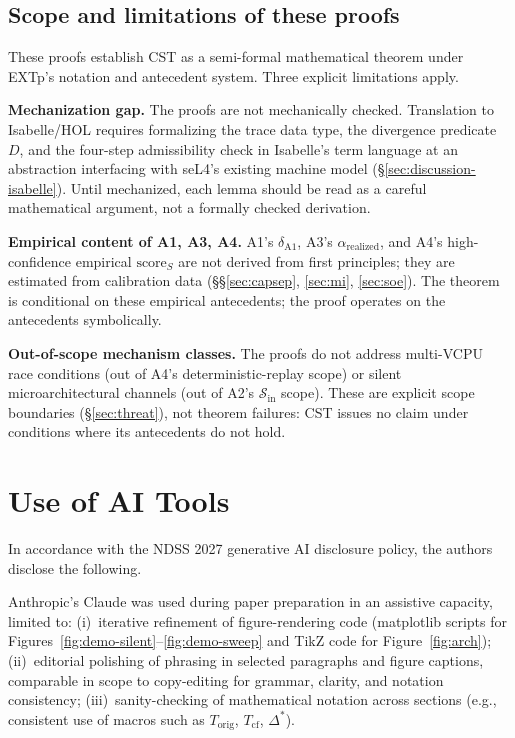 \documentclass[conference]{IEEEtran}
\newcommand{\Korig}{T_\text{orig}}
\newcommand{\Tcf}{T_\text{cf}}
\newcommand{\Dstar}{\Delta^{*}}
\newcommand{\arealized}{\alpha_\text{realized}}
\newcommand{\scoreS}{\text{score}_S}
\begin{document}
\subsection{Scope and limitations of these proofs}

These proofs establish CST as a semi-formal mathematical
theorem under EXTp's notation and antecedent system. Three
explicit limitations apply.

\textbf{Mechanization gap.} The proofs are not mechanically
checked. Translation to Isabelle/HOL requires formalizing the
trace data type, the divergence predicate $D$, and the
four-step admissibility check in Isabelle's term language at
an abstraction interfacing with seL4's existing machine model
(\S\ref{sec:discussion-isabelle}). Until mechanized, each lemma
should be read as a careful mathematical argument, not a
formally checked derivation.

\textbf{Empirical content of A1, A3, A4.} A1's
$\delta_{\text{A1}}$, A3's $\arealized$, and A4's
high-confidence empirical $\scoreS$ are not derived from first
principles; they are estimated from calibration data
(\S\S\ref{sec:capsep}, \ref{sec:mi}, \ref{sec:soe}). The theorem
is conditional on these empirical antecedents; the proof
operates on the antecedents symbolically.

\textbf{Out-of-scope mechanism classes.} The proofs do not address
multi-VCPU race conditions (out of A4's deterministic-replay
scope) or silent microarchitectural channels (out of A2's
$\mathcal{S}_\text{in}$ scope). These are explicit scope
boundaries (\S\ref{sec:threat}), not theorem failures: CST
issues no claim under conditions where its antecedents do not
hold.

\section{Use of AI Tools}\label{app:ai-disclosure}

In accordance with the NDSS 2027 generative AI disclosure
policy, the authors disclose the following.

Anthropic's Claude was used during paper preparation in an
assistive capacity, limited to: (i)~iterative refinement of
figure-rendering code (matplotlib scripts for
Figures~\ref{fig:demo-silent}--\ref{fig:demo-sweep} and TikZ
code for Figure~\ref{fig:arch}); (ii)~editorial polishing of
phrasing in selected paragraphs and figure captions, comparable
in scope to copy-editing for grammar, clarity, and notation
consistency; (iii)~sanity-checking of mathematical notation
across sections (e.g., consistent use of macros such as
$\Korig$, $\Tcf$, $\Dstar$).
\end{document}
